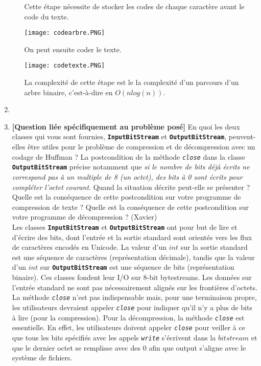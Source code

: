 \documentclass[11pt]{article}
\begin{document}
\begin{enumerate}
\begin{enumerate}
\begin{center}
\end{center}
Cette étape nécessite de stocker les codes de chaque caractère avant le code du texte.
\begin{center}
    \texttt{[image: codearbre.PNG]}
\end{center}
On peut ensuite coder le texte.
\begin{center}
    \texttt{[image: codetexte.PNG]}
\end{center}
La complexité de cette étape est le la complexité d'un parcours d'un arbre binaire, c'est-à-dire en $O(n log(n))$.\\
\end{enumerate}

\item

\item \textbf{[Question liée spécifiquement au problème posé]} En quoi les deux classes qui
vous sont fournies, \texttt{\textbf{InputBitStream}} et \texttt{\textbf{OutputBitStream}}, peuvent-elles
être utiles pour le problème de compression et de décompression avec un codage
de Huffman ? La postcondition de la méthode \texttt{\textit{close}} dans la classe \texttt{\textbf{OutputBitStream}}
précise notamment que \textit{si le nombre de bits déjà écrits ne correspond pas à un
multiple de 8 (un octet), des bits à 0 sont écrits pour compléter l’octet courant}.
Quand la situation décrite peut-elle se présenter ? Quelle est la conséquence de
cette postcondition sur votre programme de compression de texte ? Quelle est la
conséquence de cette postcondition sur votre programme de décompression ? (Xavier)\\

Les classes \texttt{\textbf{InputBitStream}} et \texttt{\textbf{OutputBitStream}} ont pour but de lire et d'écrire des bits, dont l'entrée et la sortie standard sont orientés vers les flux de caractères encodés en Unicode. La valeur d'un $int$ sur la sortie standard est une séquence de caractères (représentation décimale), tandis que la valeur d'un $int$ sur \texttt{\textbf{OutputBitStream}} est une séquence de bits (représentation binaire). Ces classes  fondent leur I/O sur 8-bit bytestreams. Les données sur l'entrée standard ne sont pas nécessairement alignés sur les frontières d'octets. La méthode \texttt{\textit{close}} n'est pas indispensable mais, pour une terminaison propre, les utilisateurs devraient appeler \texttt{\textit{close}} pour indiquer qu'il n'y a plus de bits à lire (pour la compression). Pour la décompression, la méthode \texttt{\textit{close}} est essentielle. En effet, les utilisateurs doivent appeler \texttt{\textit{close}} pour veiller à ce que tous les bits spécifiés avec les appels \texttt{\textit{write}} s'écrivent dans la $bitstream$ et que le dernier octet se remplisse avec des 0 afin que output s'aligne avec le système de fichiers.\\


\end{enumerate}
\end{document}
